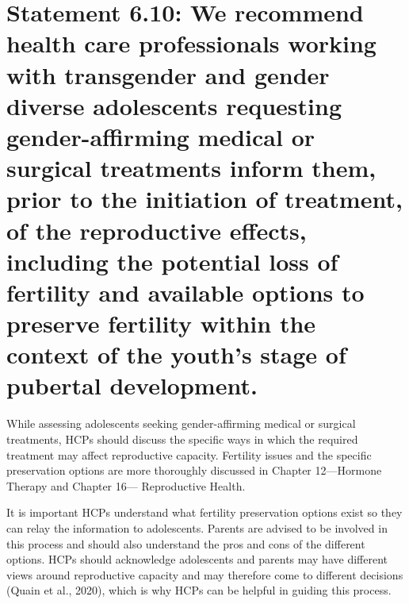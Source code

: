 \documentclass[
]{book}
\begin{document}
\hypertarget{statement-6.10-we-recommend-health-care-professionals-working-with-transgender-and-gender-diverse-adolescents-requesting-gender-affirming-medical-or-surgical-treatments-inform-them-prior-to-the-initiation-of-treatment-of-the-reproductive-effects-including-the-potential-loss-of-fertility-and-available-options-to-preserve-fertility-within-the-context-of-the-youths-stage-of-pubertal-development.}{%
\section*{Statement 6.10: We recommend health care professionals working with transgender and gender diverse adolescents requesting gender-affirming medical or surgical treatments inform them, prior to the initiation of treatment, of the reproductive effects, including the potential loss of fertility and available options to preserve fertility within the context of the youth's stage of pubertal development.}\label{statement-6.10-we-recommend-health-care-professionals-working-with-transgender-and-gender-diverse-adolescents-requesting-gender-affirming-medical-or-surgical-treatments-inform-them-prior-to-the-initiation-of-treatment-of-the-reproductive-effects-including-the-potential-loss-of-fertility-and-available-options-to-preserve-fertility-within-the-context-of-the-youths-stage-of-pubertal-development.}}

While assessing adolescents seeking
gender-affirming medical or surgical treatments,
HCPs should discuss the specific ways in which
the required treatment may affect reproductive
capacity. Fertility issues and the specific preservation options are more thoroughly discussed in
Chapter 12---Hormone Therapy and Chapter 16---
Reproductive Health.

It is important HCPs understand what fertility
preservation options exist so they can relay the
information to adolescents. Parents are advised
to be involved in this process and should also
understand the pros and cons of the different
options. HCPs should acknowledge adolescents
and parents may have different views around
reproductive capacity and may therefore come to
different decisions (Quain et al., 2020), which is
why HCPs can be helpful in guiding this process.
\end{document}
